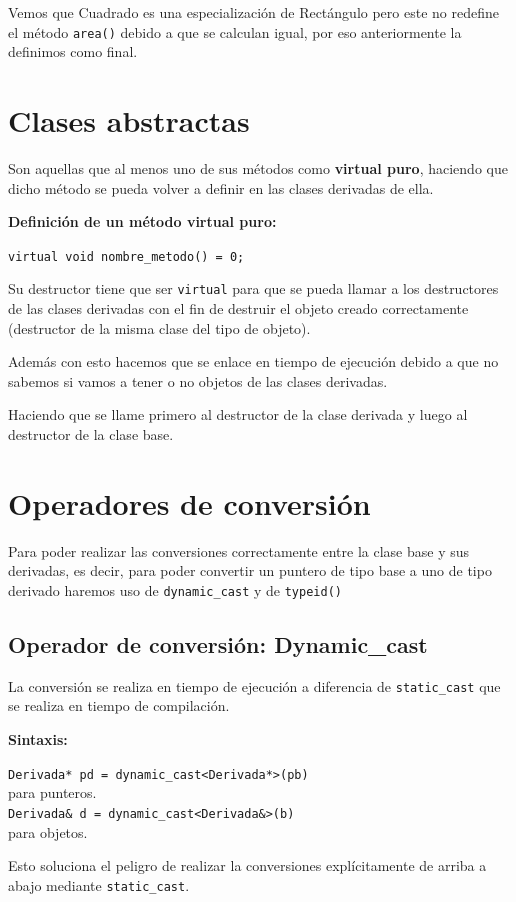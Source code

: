 Vemos que Cuadrado es una especialización de Rectángulo pero este no redefine el método \texttt{area()} debido a que se calculan igual, por eso anteriormente la definimos como final.

\section{Clases abstractas}

Son aquellas que al menos uno de sus métodos como \textbf{virtual puro}, haciendo que dicho método se pueda volver a definir en las clases derivadas de ella.

\textbf{\large{Definición de un método virtual puro:}}
\begin{center}
	\texttt{virtual void nombre\_metodo() = 0;}
\end{center}

Su destructor tiene que ser \texttt{virtual} para que se pueda llamar a los destructores de las clases derivadas con el fin de destruir el objeto creado correctamente (destructor de la misma clase del tipo de objeto).

Además con esto hacemos que se enlace en tiempo de ejecución debido a que no sabemos si vamos a tener o no objetos de las clases derivadas.

Haciendo que se llame primero al destructor de la clase derivada y luego al destructor de la clase base.


\section{Operadores de conversión}
Para poder realizar las conversiones correctamente entre la clase base y sus derivadas, es decir, para poder convertir un puntero de tipo base a uno de tipo derivado haremos uso de \texttt{dynamic\_cast} y de \texttt{typeid()}

\subsection{Operador de conversión: Dynamic\_cast}
La conversión se realiza en tiempo de ejecución a diferencia de \texttt{static\_cast} que se realiza en tiempo de compilación.

\textbf{\large Sintaxis:}
\begin{center}
	\texttt{Derivada* pd = dynamic\_cast\textless Derivada*\textgreater(pb)}\\
	para punteros.\\
	\texttt{Derivada& d = dynamic\_cast\textless Derivada\&\textgreater(b)}\\
	para objetos.
\end{center}
Esto soluciona el peligro de realizar la conversiones explícitamente de arriba a abajo mediante \texttt{static\_cast}.

